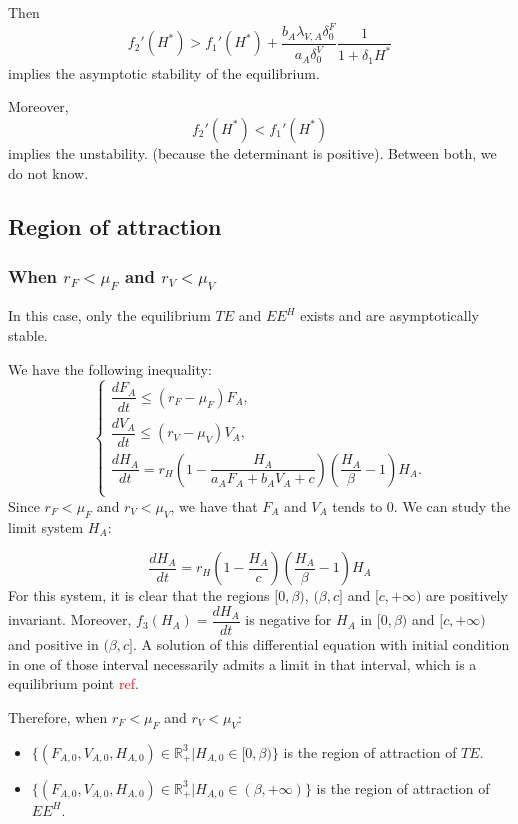 \documentclass{article}
\newcommand{\lva}{\lambda_{V, A}}
\newcommand{\df}{\delta_0^F}
\newcommand{\dv}{\delta_0^V}
\newcommand{\marc}[1]{\textcolor{red}{#1}}
\begin{document}
Then
$$
f_2'(H^*) > f_1'(H^*) + \dfrac{b_A \lva \df}{a_A \dv} \dfrac{1}{1+\delta_1 H^*}
$$
implies the asymptotic stability of the equilibrium.

Moreover, 
$$
f_2'(H^*) < f_1'(H^*)
$$
implies the unstability. (because the determinant is positive). Between both, we do not know.

\subsection{Region of attraction}
\subsubsection{When $r_F < \mu_F$ and $r_V < \mu_V$}
In this case, only the equilibrium $TE$ and $EE^{H}$ exists and are asymptotically stable.

We have the following inequality:
\begin{equation}
\left\{ \begin{array}{l}
\dfrac{dF_{A}}{dt} \leq (r_F -\mu_{F})F_A,\\
\dfrac{dV_{A}}{dt} \leq (r_V -\mu_{V})V_A,\\
\dfrac{dH_A}{dt} = r_{H}\left(1-\dfrac{H_A}{a_{A}F_{A} + b_A V_A +c}\right)\left(\dfrac{H_A}{\beta}-1\right)H_A. \\
\end{array}\right.
\end{equation}
Since $r_F < \mu_{F}$ and $r_V < \mu_{V}$, we have that $F_A$ and $V_A$ tends to 0. We can study the limit system $H_A$:

$$
\dfrac{dH_A}{dt} = r_{H}\left(1-\dfrac{H_A}{c}\right)\left(\dfrac{H_A}{\beta}-1\right)H_A
$$
For this system, it is clear that the regions $[0, \beta)$, $(\beta, c]$ and $[c, + \infty)$ are positively invariant. Moreover, $f_3(H_A) = \dfrac{dH_A}{dt}$ is negative for $H_A$ in $[0, \beta)$ and $[c, + \infty)$ and positive in $(\beta, c]$. A solution of this differential equation with initial condition in one of those interval necessarily admits a limit in that interval, which is a equilibrium point \marc{ref}.

Therefore, when $r_F < \mu_{F}$ and $r_V < \mu_{V}$:
\begin{itemize}
\item $\{(F_{A,0}, V_{A, 0}, H_{A, 0}) \in \mathbb{R}_+^3 | H_{A, 0} \in [0, \beta) \}$ is the region of attraction of $TE$.
\item $\{(F_{A,0}, V_{A, 0}, H_{A, 0}) \in \mathbb{R}_+^3 | H_{A, 0} \in (\beta, +\infty) \}$ is the region of attraction of $EE^{H}$.
\end{itemize}
\end{document}
